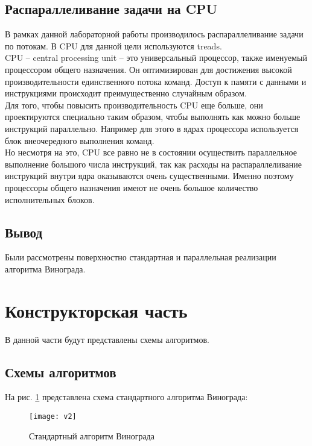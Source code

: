 \documentclass[a4paper, 14pt]{article}
\begin{document}
	\subsection{Распараллеливание задачи на CPU}
	
	В рамках данной лабораторной работы производилось распараллеливание задачи по потокам. В CPU для данной цели используются treads.  \\
	
	CPU – central processing unit – это универсальный процессор, также именуемый процессором общего назначения. Он оптимизирован для достижения высокой производительности единственного потока команд. Доступ к памяти с данными и инструкциями происходит преимущественно случайным образом.\\
	
	Для того, чтобы повысить производительность CPU еще больше, они проектируются специально таким образом, чтобы выполнять как можно больше инструкций параллельно. Например для этого в ядрах процессора используется блок внеочередного выполнения команд.\\
	
	Но несмотря на это, CPU все равно не в состоянии осуществить параллельное выполнение большого числа инструкций, так как расходы на распараллеливание инструкций внутри ядра оказываются очень существенными. Именно поэтому процессоры общего назначения имеют не очень большое количество исполнительных блоков.

	
	\subsection{Вывод}
	Были рассмотрены поверхностно стандартная и параллельная реализации алгоритма Винограда. 
	
	\newpage
	\section{Конструкторская часть}
	
	В данной части будут представлены схемы алгоритмов.

	\subsection{Схемы алгоритмов}
	
	На рис. \ref{fig:sv} представлена схема стандартного алгоритма Винограда:
	
	\begin{figure}[H]
        	\begin{center}
        		\texttt{[image: v2]}
        		\caption{Стандартный алгоритм Винограда}
        		\label{fig:sv}
        	\end{center}
        \end{figure}
\end{document}
